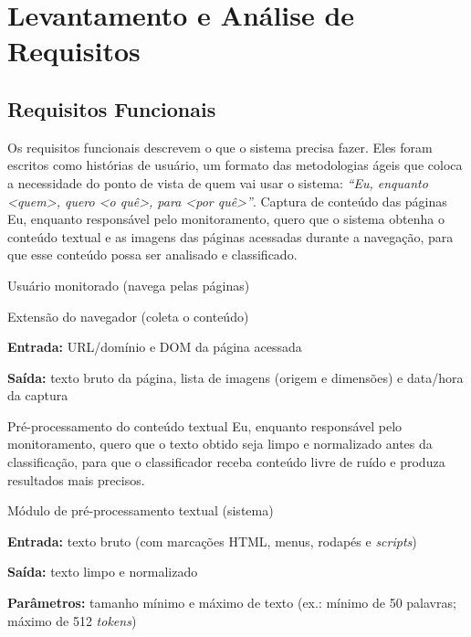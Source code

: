 \documentclass[
    12pt,           %
    oneside,        %
    a4paper,        %
    chapter=TITLE,  %
    english,        %
    brazil          %
]{abntex2}
\begin{document}
\chapter{Levantamento e Análise de Requisitos}

\section{Requisitos Funcionais}

Os requisitos funcionais descrevem o que o sistema precisa fazer. Eles foram
escritos como histórias de usuário, um formato das metodologias ágeis que
coloca a necessidade do ponto de vista de quem vai usar o sistema:
\textit{``Eu, enquanto <quem>, quero <o quê>, para <por quê>''}.
{Captura de conteúdo das páginas}
{Eu, enquanto responsável pelo monitoramento, quero que o sistema obtenha o conteúdo textual e as imagens das páginas acessadas durante a navegação, para que esse conteúdo possa ser analisado e classificado.}
{\begin{dadoslista}
\item Usuário monitorado (navega pelas páginas)
\item Extensão do navegador (coleta o conteúdo)
\end{dadoslista}}
{\begin{dadoslista}
\item \textbf{Entrada:} URL/domínio e DOM da página acessada
\item \textbf{Saída:} texto bruto da página, lista de imagens (origem e dimensões) e data/hora da captura
\end{dadoslista}}

{Pré-processamento do conteúdo textual}
{Eu, enquanto responsável pelo monitoramento, quero que o texto obtido seja limpo e normalizado antes da classificação, para que o classificador receba conteúdo livre de ruído e produza resultados mais precisos.}
{\begin{dadoslista}
\item Módulo de pré-processamento textual (sistema)
\end{dadoslista}}
{\begin{dadoslista}
\item \textbf{Entrada:} texto bruto (com marcações HTML, menus, rodapés e \textit{scripts})
\item \textbf{Saída:} texto limpo e normalizado
\item \textbf{Parâmetros:} tamanho mínimo e máximo de texto (ex.: mínimo de 50 palavras; máximo de 512 \textit{tokens})
\end{dadoslista}}
\end{document}
